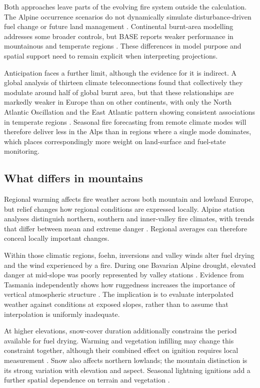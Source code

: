 \documentclass[11pt,a4paper]{article}
\begin{document}
Both approaches leave parts of the evolving fire system outside the calculation. The Alpine occurrence scenarios do not dynamically simulate disturbance-driven fuel change or future land management \citep{gerberding_mapping_2025}. Continental burnt-area modelling addresses some broader controls, but BASE reports weaker performance in mountainous and temperate regions \citep{forrest_understanding_2024}. These differences in model purpose and spatial support need to remain explicit when interpreting projections.

Anticipation faces a further limit, although the evidence for it is indirect. A global analysis of thirteen climate teleconnections found that collectively they modulate around half of global burnt area, but that these relationships are markedly weaker in Europe than on other continents, with only the North Atlantic Oscillation and the East Atlantic pattern showing consistent associations in temperate regions \citep{cardil_climate_2023}. Seasonal fire forecasting from remote climate modes will therefore deliver less in the Alps than in regions where a single mode dominates, which places correspondingly more weight on land-surface and fuel-state monitoring.

\subsection{What differs in mountains}

Regional warming affects fire weather across both mountain and lowland Europe, but relief changes how regional conditions are expressed locally. Alpine station analyses distinguish northern, southern and inner-valley fire climates, with trends that differ between mean and extreme danger \citep{wastl_recent_2012, wastl_largescale_2013}. Regional averages can therefore conceal locally important changes.

Within those climatic regions, foehn, inversions and valley winds alter fuel drying and the wind experienced by a fire. During one Bavarian Alpine drought, elevated danger at mid-slope was poorly represented by valley stations \citep{schunk_forest_2013}. Evidence from Tasmania independently shows how ruggedness increases the importance of vertical atmospheric structure \citep{ozaki_impact_2022}. The implication is to evaluate interpolated weather against conditions at exposed slopes, rather than to assume that interpolation is uniformly inadequate.

At higher elevations, snow-cover duration additionally constrains the period available for fuel drying. Warming and vegetation infilling may change this constraint together, although their combined effect on ignition requires local measurement \citep{rangwala_climate_2012, frei_evidence_2023}. Snow also affects northern lowlands; the mountain distinction is its strong variation with elevation and aspect. Seasonal lightning ignitions add a further spatial dependence on terrain and vegetation \citep{conedera_lightninginduced_2006, muller_towards_2020}.
\end{document}
